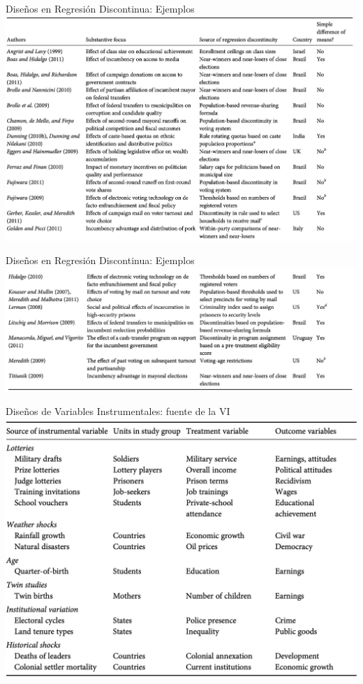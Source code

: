 \documentclass[
  ignorenonframetext,
]{beamer}
\begin{document}
\begin{frame}{Diseños en Regresión Discontinua: Ejemplos}
\protect\hypertarget{diseuxf1os-en-regresiuxf3n-discontinua-ejemplos}{}
\includegraphics{figs/nat_exp_RDD2.png}
\end{frame}

\begin{frame}{Diseños en Regresión Discontinua: Ejemplos}
\protect\hypertarget{diseuxf1os-en-regresiuxf3n-discontinua-ejemplos-1}{}
\includegraphics{figs/nat_exp_RDD3.png}
\end{frame}

\begin{frame}{Diseños de Variables Instrumentales: fuente de la VI}
\protect\hypertarget{diseuxf1os-de-variables-instrumentales-fuente-de-la-vi}{}
\includegraphics{figs/nat_exp_IV1.png}
\end{frame}
\end{document}
